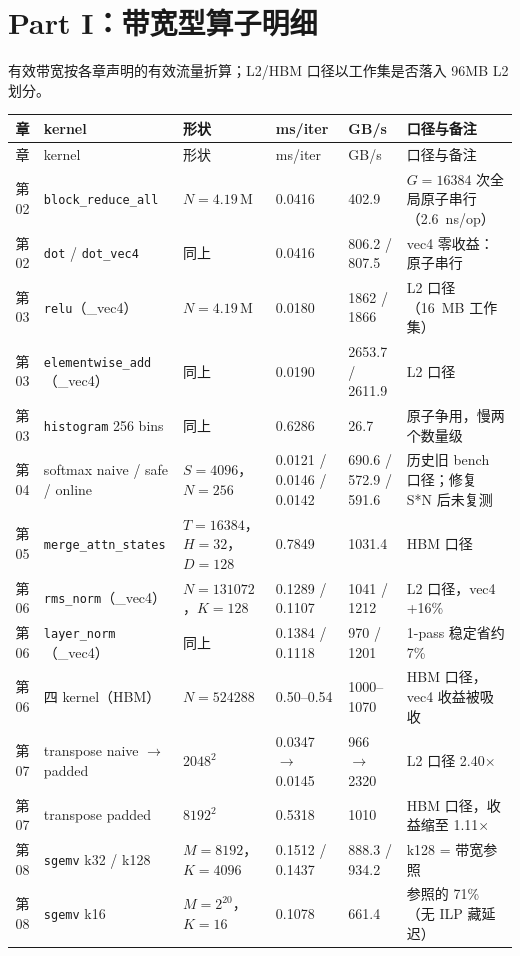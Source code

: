 \section{Part I：带宽型算子明细}

有效带宽按各章声明的有效流量折算；L2/HBM 口径以工作集是否落入 96MB L2 划分。

\begingroup\small
\begin{longtable}{cp{3.7cm}p{2.9cm}p{2.3cm}p{2.0cm}p{2.9cm}}
\toprule
章 & kernel & 形状 & ms/iter & GB/s & 口径与备注 \\
\midrule
\endfirsthead
\toprule
章 & kernel & 形状 & ms/iter & GB/s & 口径与备注 \\
\midrule
\endhead
\endfoot
\bottomrule
\endlastfoot
第02 & \texttt{block\_\allowbreak{}reduce\_\allowbreak{}all} & $N{=}4.19\,$M & 0.0416 & 402.9 & $G{=}16384$ 次全局原子串行（2.6~ns/op） \\
第02 & \texttt{dot} / \texttt{dot\_vec4} & 同上 & 0.0416 & 806.2 / 807.5 & vec4 零收益：原子串行 \\
第03 & \texttt{relu}（\_vec4） & $N{=}4.19\,$M & 0.0180 & 1862 / 1866 & L2 口径（16~MB 工作集） \\
第03 & \texttt{elementwise\_\allowbreak{}add}（\_vec4） & 同上 & 0.0190 & 2653.7 / 2611.9 & L2 口径 \\
第03 & \texttt{histogram} 256 bins & 同上 & 0.6286 & 26.7 & 原子争用，慢两个数量级 \\
第04 & softmax naive / safe / online & $S{=}4096$，$N{=}256$ & 0.0121 / 0.0146 / 0.0142 & 690.6 / 572.9 / 591.6 & 历史旧 bench 口径；修复 S*N 后未复测 \\
第05 & \texttt{merge\_\allowbreak{}attn\_\allowbreak{}states} & $T{=}16384$，$H{=}32$，$D{=}128$ & 0.7849 & 1031.4 & HBM 口径 \\
第06 & \texttt{rms\_norm}（\_vec4） & $N{=}131072$，$K{=}128$ & 0.1289 / 0.1107 & 1041 / 1212 & L2 口径，vec4 +16\% \\
第06 & \texttt{layer\_norm}（\_vec4） & 同上 & 0.1384 / 0.1118 & 970 / 1201 & 1-pass 稳定省约 7\% \\
第06 & 四 kernel（HBM） & $N{=}524288$ & 0.50--0.54 & 1000--1070 & HBM 口径，vec4 收益被吸收 \\
第07 & transpose naive $\to$ padded & $2048^2$ & 0.0347 $\to$ 0.0145 & 966 $\to$ 2320 & L2 口径 2.40$\times$ \\
第07 & transpose padded & $8192^2$ & 0.5318 & 1010 & HBM 口径，收益缩至 1.11$\times$ \\
第08 & \texttt{sgemv} k32 / k128 & $M{=}8192$，$K{=}4096$ & 0.1512 / 0.1437 & 888.3 / 934.2 & k128 = 带宽参照 \\
第08 & \texttt{sgemv} k16 & $M{=}2^{20}$，$K{=}16$ & 0.1078 & 661.4 & 参照的 71\%（无 ILP 藏延迟） \\
\end{longtable}
\endgroup

